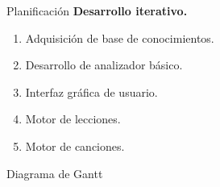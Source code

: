 \begin{frame}{Planificación}
  \textbf{Desarrollo iterativo.} \pause
  \begin{enumerate}
  \item Adquisición de base de conocimientos. \pause
  \item Desarrollo de analizador básico. \pause
  \item Interfaz gráfica de usuario. \pause
  \item Motor de lecciones. \pause
  \item Motor de canciones. \pause
  \end{enumerate}
\end{frame}

{
  \begin{frame}{Diagrama de Gantt}

\end{frame}}
